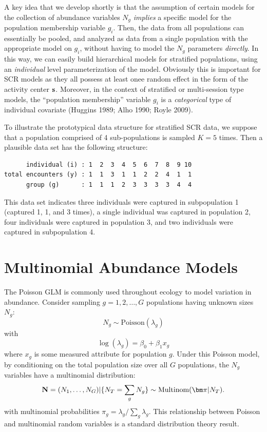 A key idea that we develop shortly is that 
the assumption of certain models for the collection of abundance variables
$N_{g}$ {\it implies} a specific model for the population membership
variable $g_{i}$.  
Then, the data from all populations can essentially
be pooled, and analyzed as data from a single population with the
appropriate model on $g_{i}$, without having to model the $N_{g}$
parameters {\it directly}. In this way, we can easily build
hierarchical models for stratified populations, using an {\it
  individual} level parameterization of the model. Obviously this is
important for SCR models as they all possess at least onee random
effect in the form of the activity center ${\bf s}$. Moreover, in the
context of stratified or multi-session type models, the ``population
membership'' variable $g_{i}$ is a {\it categorical} type of individual
covariate (Huggins 1989; Alho 1990; Royle 2009).  

To illustrate the prototypical  data structure for stratified SCR data, we suppose that a population
comprised of 4 sub-populations is sampled $K=5$ times. Then a
plausible data set has the following structure:
\begin{verbatim}
      individual (i) : 1  2  3  4  5  6  7  8  9 10  
total encounters (y) : 1  1  3  1  1  2  2  4  1  1
      group (g)      : 1  1  1  2  3  3  3  3  4  4
\end{verbatim}
This data set indicates three individuals were captured in subpopulation 1
(captured 1, 1, and 3 times), a single individual was captured in
population 2, four individuals were captured in population 3, and two
individuals were captured in subpopulation 4.


\section{Multinomial Abundance Models}

The Poisson GLM is commonly used throughout ecology to model variation
in abundance.  Consider sampling $g=1,2,\ldots,G$ populations having
unknown sizes $N_{g}$:
\begin{equation}
 N_{g} \sim \mbox{Poisson}(\lambda_{g})
\label{eq.poisson1}
\end{equation}
with
\begin{equation}
\log( \lambda_{g} ) = \beta_{0} + \beta_{1} x_{g}
\label{eq.poisson2}
\end{equation}
where $x_{g}$ is some measured attribute for population $g$. Under this
Poisson model, by conditioning on the total population size over all
$G$ populations, the $N_{g}$ variables have a multinomial distribution:
\begin{equation}
{\bf N} = (N_{1},\ldots,N_{G}) | \{ N_{T} =
\sum_{g} N_{g} \} \sim \mbox{Multinom}( {\bm \pi} | N_{T}).
\label{eq.mn.N}
\end{equation}
with 
multinomial probabilities $\pi_{g} = \lambda_{g}/\sum_{g}
\lambda_{g}$. This relationship between Poisson and multinomial random
variables is a standard distribution theory result. 


